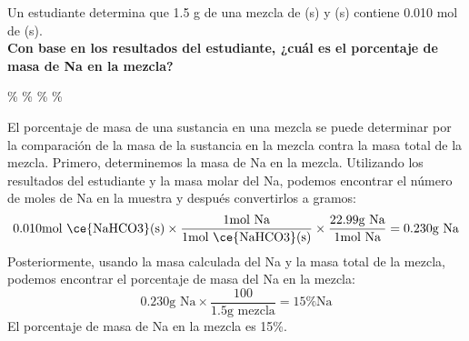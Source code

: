 Un estudiante determina que 1.5 g de una mezcla de (s) y (s) contiene 0.010 mol de (s).\\
\textbf{Con base en los resultados del estudiante, ¿cuál es el porcentaje de masa de Na en la mezcla?}\\

\begin{oneparchoices}
    \%
    \%
    \%
    \%
\end{oneparchoices}

\begin{solutionbox}{6cm}
    El porcentaje de masa de una sustancia en una mezcla se puede determinar por la comparación de la masa de la sustancia en la mezcla contra la masa total de la mezcla.
    Primero, determinemos la masa de Na en la mezcla. Utilizando los resultados del estudiante y la masa molar del Na, podemos encontrar el número de moles de Na en la muestra y después convertirlos a gramos:
    \[0.010\text{mol \ce{NaHCO3}(s)} \times \frac{1\text{mol Na}}{1\text{mol \ce{NaHCO3}(s)}} \times \frac{22.99\text{g Na}}{1\text{mol Na}} = 0.230\text{g Na}\]
    Posteriormente, usando la masa calculada del Na y la masa total de la mezcla, podemos encontrar el porcentaje de masa del Na en la mezcla:
\[0.230\text{g Na} \times \frac{100}{1.5\text{g mezcla}} = 15\text{\% Na}\]
    El porcentaje de masa de Na en la mezcla es 15\%.
\end{solutionbox}
